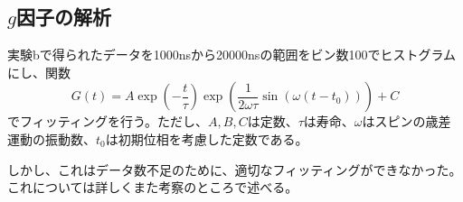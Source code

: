 \subsection{$g$因子の解析}
実験bで得られたデータを1000nsから20000nsの範囲をビン数100でヒストグラムにし、関数
\begin{equation}
G(t)=A\exp\left(-\frac{t}{\tau}\right)\exp\left(\frac{1}{2\omega\tau}\sin(\omega(t-t_0))\right)+C
\label{eq:g-fit}
\end{equation}
でフィッティングを行う。ただし、$A,B,C$は定数、$\tau$は寿命、$\omega$はスピンの歳差運動の振動数、$t_0$は初期位相を考慮した定数である。


しかし、これはデータ数不足のために、適切なフィッティングができなかった。これについては詳しくまた考察のところで述べる。
